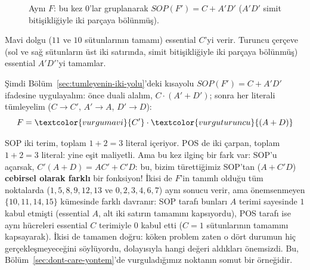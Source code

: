 \begin{ornek}
\begin{figure}[H]
\centering
{}
\caption{Aynı $F$: bu kez $0$'lar gruplanarak $SOP(F')=C+A'D'$ ($A'D'$ simit
bitişikliğiyle iki parçaya bölünmüş).}
\label{fig:kmap-kilit-pos}
\end{figure}
Mavi dolgu ($11$ ve $10$ sütunlarının tamamı) essential $C$'yi verir. Turuncu
çerçeve (sol ve sağ sütunların üst iki satırında, simit bitişikliğiyle iki
parçaya bölünmüş) essential $A'D'$'yi tamamlar.

Şimdi Bölüm~\ref{sec:tumleyenin-iki-yolu}'deki kısayolu $SOP(F')=C+A'D'$
ifadesine uygulayalım: önce duali alalım, $C\cdot(A'+D')$; sonra her literali
tümleyelim ($C\to C'$, $A'\to A$, $D'\to D$):
\[
F = \textcolor{vurgumavi}{C'}\cdot\textcolor{vurguturuncu}{(A+D)}
\]

SOP iki terim, toplam $1+2=3$ literal içeriyor. POS de iki çarpan, toplam
$1+2=3$ literal: yine eşit maliyetli. Ama bu kez ilginç bir fark var: SOP'u
açarsak, $C'(A+D)=AC'+C'D$: bu, bizim türettiğimiz SOP'tan ($A+C'D$) \textbf{cebirsel
olarak farklı} bir fonksiyon! İkisi de $F$'in tanımlı olduğu tüm noktalarda
($1,5,8,9,12,13$ ve $0,2,3,4,6,7$) aynı sonucu verir, ama önemsenmeyen
$\{10,11,14,15\}$ kümesinde farklı davranır: SOP tarafı bunları $A$ terimi
sayesinde $1$ kabul etmişti (essential $A$, alt iki satırın tamamını kapsıyordu),
POS tarafı ise aynı hücreleri essential $C$ terimiyle $0$ kabul etti ($C=1$
sütunlarının tamamını kapsayarak). İkisi de tamamen doğru: köken problem zaten
o dört durumun hiç gerçekleşmeyeceğini söylüyordu, dolayısıyla hangi değeri
aldıkları önemsizdi. Bu, Bölüm~\ref{sec:dont-care-yontem}'de vurguladığımız
noktanın somut bir örneğidir.


\end{ornek}
